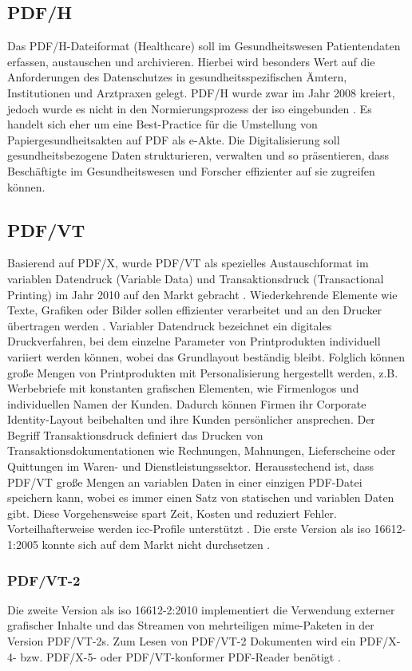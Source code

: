 \subsection{PDF/H}
Das PDF/H-Dateiformat (Healthcare) soll im Gesundheitswesen Patientendaten erfassen, austauschen und archivieren. Hierbei wird besonders Wert auf die Anforderungen des Datenschutzes in gesundheitsspezifischen Ämtern, Institutionen und Arztpraxen gelegt. PDF/H wurde zwar im Jahr 2008 kreiert, jedoch wurde es nicht in den Normierungsprozess der \gls{iso} eingebunden \cite{proj-consult}. Es handelt sich eher um eine Best-Practice für die Umstellung von Papiergesundheitsakten auf PDF als e-Akte. Die Digitalisierung soll gesundheitsbezogene Daten strukturieren, verwalten und so präsentieren, dass Beschäftigte im Gesundheitswesen und Forscher effizienter auf sie zugreifen können.

\subsection{PDF/VT}
Basierend auf PDF/X, wurde PDF/VT als spezielles Austauschformat im variablen Datendruck (Variable Data) und Transaktionsdruck (Transactional Printing) im Jahr 2010 auf den Markt gebracht \cite{adobe-pdf-vt}. Wiederkehrende Elemente wie Texte, Grafiken oder Bilder sollen effizienter verarbeitet und an den Drucker übertragen werden \cite{adobe-pdf-e}. Variabler Datendruck bezeichnet ein digitales Druckverfahren, bei dem einzelne Parameter von Printprodukten individuell variiert werden können, wobei das Grundlayout beständig bleibt. Folglich können große Mengen von Printprodukten mit Personalisierung hergestellt werden, z.B. Werbebriefe mit konstanten grafischen Elementen, wie Firmenlogos und individuellen Namen der Kunden. Dadurch können Firmen ihr Corporate Identity-Layout beibehalten und ihre Kunden persönlicher ansprechen. Der Begriff Transaktionsdruck definiert das Drucken von Transaktionsdokumentationen wie Rechnungen, Mahnungen, Lieferscheine oder Quittungen im Waren- und Dienstleistungssektor. Herausstechend ist, dass PDF/VT große Mengen an variablen Daten in einer einzigen PDF-Datei speichern kann, wobei es immer einen Satz von statischen und variablen Daten gibt. Diese Vorgehensweise spart Zeit, Kosten und reduziert Fehler. Vorteilhafterweise werden \gls{icc}-Profile unterstützt \cite{adobe-pdf-vt}. Die erste Version als \gls{iso} 16612-1:2005 konnte sich auf dem Markt nicht durchsetzen \cite{proj-consult}.

\subsubsection{PDF/VT-2}
Die zweite Version als \gls{iso} 16612-2:2010 implementiert die Verwendung externer grafischer Inhalte und das Streamen von mehrteiligen \gls{mime}-Paketen in der Version PDF/VT-2s. Zum Lesen von PDF/VT-2 Dokumenten wird ein PDF/X-4- bzw. PDF/X-5- oder PDF/VT-konformer PDF-Reader benötigt \cite{proj-consult}.

